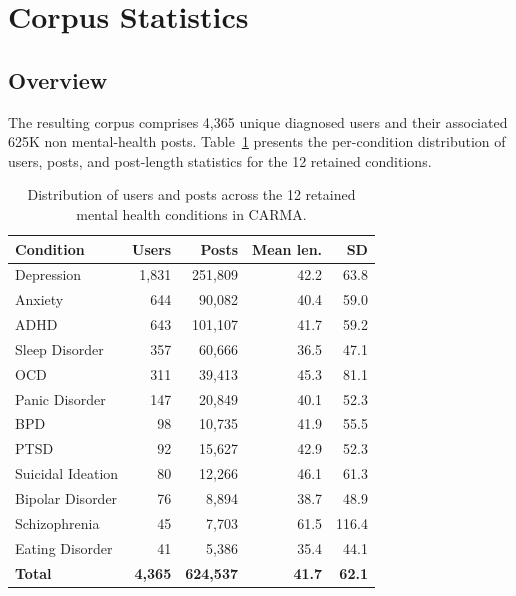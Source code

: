 \documentclass[11pt]{article}
\begin{document}
\section{Corpus Statistics}
\label{sec:corpus}

\subsection{Overview}
\label{subsec:corpus_overview}
The resulting corpus comprises 4,365 unique diagnosed users and their associated 625K non mental-health posts. Table~\ref{tab:corpus_summary} presents the per-condition distribution of users, posts, and post-length statistics for the 12 retained conditions.

\begin{table}[h]
\centering
\small
\begin{tabular}{lrrrr}
\toprule
\textbf{Condition} & \textbf{Users} & \textbf{Posts} & \textbf{Mean len.} & \textbf{SD} \\
\midrule
Depression          & 1,831 & 251,809 & 42.2 & 63.8 \\
Anxiety             &   644 &  90,082 & 40.4 & 59.0 \\
ADHD                &   643 & 101,107 & 41.7 & 59.2 \\
Sleep Disorder      &   357 &  60,666 & 36.5 & 47.1 \\
OCD                 &   311 &  39,413 & 45.3 & 81.1 \\
Panic Disorder      &   147 &  20,849 & 40.1 & 52.3 \\
BPD                 &    98 &  10,735 & 41.9 & 55.5 \\
PTSD                &    92 &  15,627 & 42.9 & 52.3 \\
Suicidal Ideation   &    80 &  12,266 & 46.1 & 61.3 \\
Bipolar Disorder    &    76 &   8,894 & 38.7 & 48.9 \\
Schizophrenia       &    45 &   7,703 & 61.5 & 116.4 \\
Eating Disorder     &    41 &   5,386 & 35.4 & 44.1 \\
\midrule
\textbf{Total} & \textbf{4,365} & \textbf{624,537} & \textbf{41.7} & \textbf{62.1} \\
\bottomrule
\end{tabular}
\caption{Distribution of users and posts across the 12 retained mental
health conditions in CARMA.}
\label{tab:corpus_summary}
\end{table}
\end{document}
